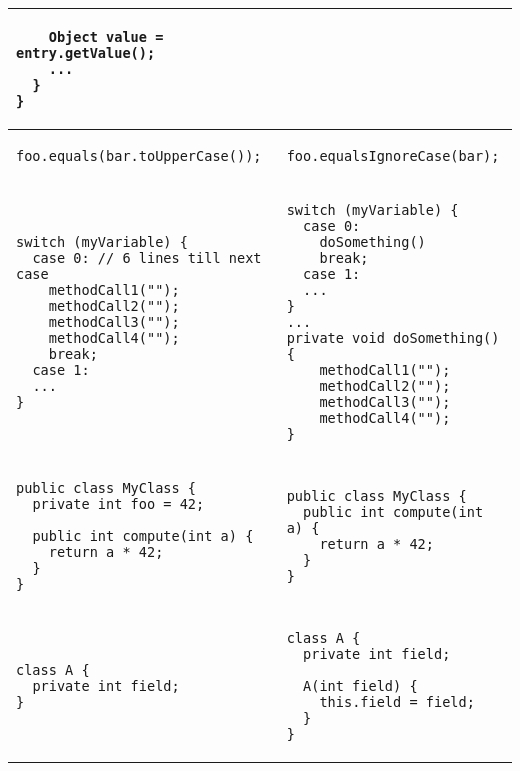 \documentclass[a4paper]{article}
\begin{document}
\begin{center}
\begin{tabular}{|p{}|p{}|}
\begin{lstlisting}
    Object value = entry.getValue();
    ...
  }
}
  	\end{lstlisting}  \\
  	\hline
	\begin{lstlisting}
foo.equals(bar.toUpperCase());
  	\end{lstlisting} 
   	& 
   	\begin{lstlisting}
foo.equalsIgnoreCase(bar);  
  	\end{lstlisting}  \\
  	\hline
	\begin{lstlisting}
switch (myVariable) {
  case 0: // 6 lines till next case
    methodCall1("");
    methodCall2("");
    methodCall3("");
    methodCall4("");
    break;
  case 1:
  ...
}
  	\end{lstlisting} 
   	& 
   	\begin{lstlisting}
switch (myVariable) {
  case 0:                  
    doSomething()
    break;
  case 1:
  ...
}
...
private void doSomething(){
    methodCall1("");
    methodCall2("");
    methodCall3("");
    methodCall4("");
} 
  	\end{lstlisting}  \\
  	\hline
	\begin{lstlisting}
public class MyClass {
  private int foo = 42;

  public int compute(int a) {
    return a * 42;
  }
}
  	\end{lstlisting} 
   	& 
   	\begin{lstlisting}
public class MyClass {
  public int compute(int a) {
    return a * 42;
  }
}
  	\end{lstlisting}  \\
  	\hline
	\begin{lstlisting}
class A { 
  private int field;
}
  	\end{lstlisting} 
   	& 
   	\begin{lstlisting}
class A {
  private int field;

  A(int field) {
    this.field = field;
  }
}
  	\end{lstlisting}  \\
  	\hline
\end{tabular}  
  
\end{center} 
\end{document}
